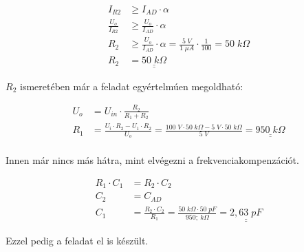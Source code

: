 \begin{equation}
\begin{aligned}{}
    I_{R2} &\geq I_{AD} \cdot \alpha{} \\
    \frac{U_o}{I_{R2}} &\geq \frac{U_o}{I_{AD}} \cdot \alpha{} \\
    R_{2} &\geq \frac{U_o}{I_{AD}} \cdot \alpha{} = \frac{5\;V}{1\;\mu{}A} \cdot \frac{1}{100} = 50\; k\Omega{} \\
    R_2 &= \underline{\underline{50\; k\Omega{}}}
\end{aligned}
\end{equation}

$R_2$ ismeretében már a feladat egyértelmúen megoldható:

\begin{equation}
\begin{aligned}{}
    U_{o} &= U_{in} \cdot \frac{R_2}{R_1 + R_2} \\
    R_{1} &= \frac{U_i \cdot R_2 - U_1 \cdot R_2}{U_o} = \frac{100\;V \cdot 50\; k\Omega{} - 5\; V \cdot 50\; k\Omega{}}{5 \;V} = \underline{\underline{950 \; k\Omega{}}} \\
\end{aligned}
\end{equation}

Innen már nincs más hátra, mint elvégezni a frekvenciakompenzációt.

\begin{equation}
\begin{aligned}{}
    R_1 \cdot C_1 &=  R_2 \cdot C_2 \\
    C_2 &= C_{AD} \\
    C_1 &= \frac{R_2 \cdot C_2}{R_1} = \frac{50\; k\Omega \cdot 50\; pF}{950;\ k\Omega} = \underline{\underline{2,63\; pF}}
\end{aligned}
\end{equation}

Ezzel pedig a feladat el is készült.

